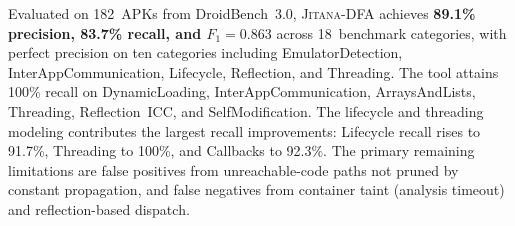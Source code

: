 \documentclass[conference]{IEEEtran}
\begin{document}
Evaluated on 182~APKs from DroidBench~3.0, \textsc{Jitana-DFA} achieves
\textbf{89.1\% precision, 83.7\% recall, and $F_1 = 0.863$} across
18~benchmark categories, with perfect precision on ten categories including
EmulatorDetection, InterAppCommunication, Lifecycle, Reflection, and Threading.
The tool attains 100\% recall on DynamicLoading, InterAppCommunication,
ArraysAndLists, Threading, Reflection~ICC, and SelfModification. The lifecycle
and threading modeling contributes the largest recall improvements: Lifecycle
recall rises to 91.7\%, Threading to 100\%, and Callbacks to 92.3\%. The primary
remaining limitations are false positives from unreachable-code paths not pruned
by constant propagation, and false negatives from container taint (analysis
timeout) and reflection-based dispatch.


\end{document}
